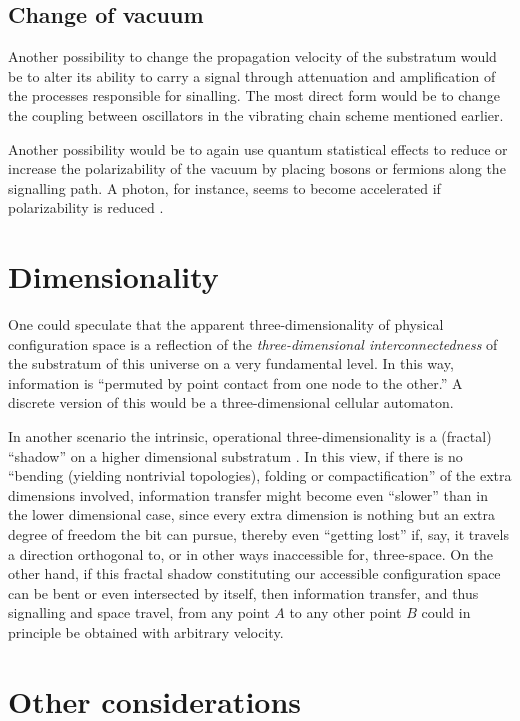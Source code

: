 \documentclass[%
  twocolumn,
 showpacs,
 showkeys,
 preprintnumbers,
 amsmath,amssymb,
 aps,
 prl,
  longbibliography,
 ]{revtex4-1}
\theoremstyle{definition}
\theoremstyle{remark}
\begin{document}
\subsection{Change of vacuum}

Another possibility to change the propagation velocity of the substratum would be to alter its ability
to carry a signal through attenuation and amplification of the processes responsible for sinalling.
The most direct form would be to change the coupling between oscillators in the vibrating chain scheme mentioned earlier.

Another possibility would be to again use quantum statistical effects to reduce or increase the polarizability of the vacuum
by placing bosons or fermions along the signalling path.
A photon, for instance, seems to become accelerated if polarizability is reduced \cite{Scharnhorst-1998,svozil-putz-sol}.

\section{Dimensionality}

One could speculate that the apparent three-dimensionality of physical configuration space is
a reflection of the {\em three-dimensional interconnectedness} of the substratum of this universe
on a very fundamental level.
In this way, information is ``permuted by point contact from one node to the other.''
A discrete version of this would be a three-dimensional cellular automaton.

In another scenario the intrinsic, operational three-dimensionality
is a (fractal) ``shadow'' on a higher dimensional substratum \cite{sv4}.
In this view, if there is no ``bending (yielding nontrivial topologies), folding or compactification'' of the extra dimensions involved,
information transfer might become even ``slower'' than in the lower dimensional case, since every extra dimension is nothing but
an extra degree of freedom the bit can pursue, thereby even ``getting lost'' if, say, it travels a direction orthogonal to,
or in other ways inaccessible for, three-space.
On the other hand, if this fractal shadow constituting our accessible configuration space
can be bent or even intersected by itself,
then information transfer, and thus signalling and space travel, from any point $A$ to any other point $B$
could in principle be obtained with arbitrary velocity.




\section{Other considerations}
\end{document}
